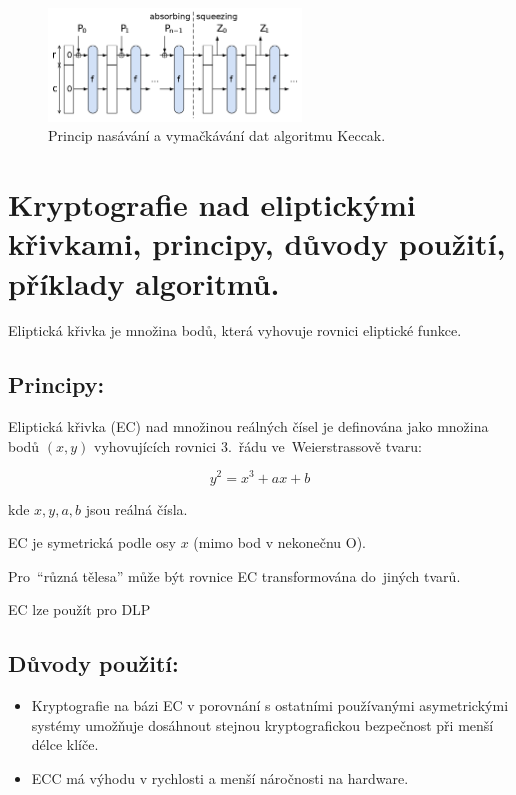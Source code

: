 \begin{figure}
    \centering
    \includegraphics[width=0.6\textwidth]{img/sponge-construction}
    \caption{Princip nasávání a vymačkávání dat algoritmu Keccak.}
    \label{keccak}
\end{figure}


\clearpage
\section{Kryptografie nad eliptickými křivkami, principy, důvody použití, příklady algoritmů.}

Eliptická křivka je množina bodů, která vyhovuje rovnici eliptické funkce.

\subsection{Principy:}
Eliptická křivka (EC) nad množinou reálných čísel je definována jako množina bodů $(x,y)$ vyhovujících rovnici 3.~řádu ve~Weierstrassově tvaru:

$$y^2=x^3+ax+b$$

kde $x, y, a, b$ jsou reálná čísla.

EC je symetrická podle osy $x$ (mimo bod v nekonečnu O).

Pro~\enquote{různá tělesa} může být rovnice EC transformována do~jiných tvarů.


EC lze použít pro DLP
\subsection{Důvody použití:}
\begin{itemize}
    \item Kryptografie na bázi EC v porovnání s ostatními používanými asymetrickými systémy umožňuje dosáhnout stejnou kryptografickou bezpečnost při menší délce klíče.
    \item ECC má výhodu v rychlosti a menší náročnosti na hardware.
\end{itemize}

